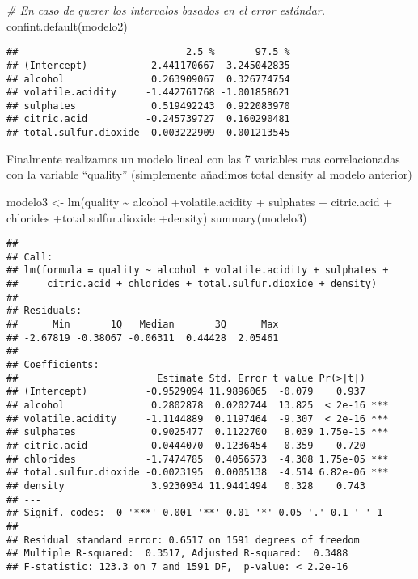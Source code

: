 \documentclass[
]{article}
\newenvironment{Shaded}{\begin{snugshade}}{\end{snugshade}}
\newcommand{\CommentTok}[1]{\textcolor[rgb]{0.56,0.35,0.01}{\textit{#1}}}
\newcommand{\FunctionTok}[1]{\textcolor[rgb]{0.00,0.00,0.00}{#1}}
\newcommand{\NormalTok}[1]{#1}
\newcommand{\OtherTok}[1]{\textcolor[rgb]{0.56,0.35,0.01}{#1}}
\newcommand{\SpecialCharTok}[1]{\textcolor[rgb]{0.00,0.00,0.00}{#1}}
\begin{document}
\begin{Shaded}
\begin{Highlighting}[]
\CommentTok{\# En caso de querer los intervalos basados en el error estándar.}
\FunctionTok{confint.default}\NormalTok{(modelo2)}
\end{Highlighting}
\end{Shaded}

\begin{verbatim}
##                             2.5 %       97.5 %
## (Intercept)           2.441170667  3.245042835
## alcohol               0.263909067  0.326774754
## volatile.acidity     -1.442761768 -1.001858621
## sulphates             0.519492243  0.922083970
## citric.acid          -0.245739727  0.160290481
## total.sulfur.dioxide -0.003222909 -0.001213545
\end{verbatim}

Finalmente realizamos un modelo lineal con las 7 variables mas
correlacionadas con la variable ``quality'' (simplemente añadimos total
density al modelo anterior)

\begin{Shaded}
\begin{Highlighting}[]
\NormalTok{modelo3 }\OtherTok{\textless{}{-}} \FunctionTok{lm}\NormalTok{(quality }\SpecialCharTok{\textasciitilde{}}\NormalTok{ alcohol }\SpecialCharTok{+}\NormalTok{volatile.acidity }\SpecialCharTok{+}\NormalTok{ sulphates }\SpecialCharTok{+}\NormalTok{ citric.acid }\SpecialCharTok{+}\NormalTok{ chlorides }\SpecialCharTok{+}\NormalTok{total.sulfur.dioxide }\SpecialCharTok{+}\NormalTok{density)}
\FunctionTok{summary}\NormalTok{(modelo3)}
\end{Highlighting}
\end{Shaded}

\begin{verbatim}
## 
## Call:
## lm(formula = quality ~ alcohol + volatile.acidity + sulphates + 
##     citric.acid + chlorides + total.sulfur.dioxide + density)
## 
## Residuals:
##      Min       1Q   Median       3Q      Max 
## -2.67819 -0.38067 -0.06311  0.44428  2.05461 
## 
## Coefficients:
##                        Estimate Std. Error t value Pr(>|t|)    
## (Intercept)          -0.9529094 11.9896065  -0.079    0.937    
## alcohol               0.2802878  0.0202744  13.825  < 2e-16 ***
## volatile.acidity     -1.1144889  0.1197464  -9.307  < 2e-16 ***
## sulphates             0.9025477  0.1122700   8.039 1.75e-15 ***
## citric.acid           0.0444070  0.1236454   0.359    0.720    
## chlorides            -1.7474785  0.4056573  -4.308 1.75e-05 ***
## total.sulfur.dioxide -0.0023195  0.0005138  -4.514 6.82e-06 ***
## density               3.9230934 11.9441494   0.328    0.743    
## ---
## Signif. codes:  0 '***' 0.001 '**' 0.01 '*' 0.05 '.' 0.1 ' ' 1
## 
## Residual standard error: 0.6517 on 1591 degrees of freedom
## Multiple R-squared:  0.3517, Adjusted R-squared:  0.3488 
## F-statistic: 123.3 on 7 and 1591 DF,  p-value: < 2.2e-16
\end{verbatim}
\end{document}
